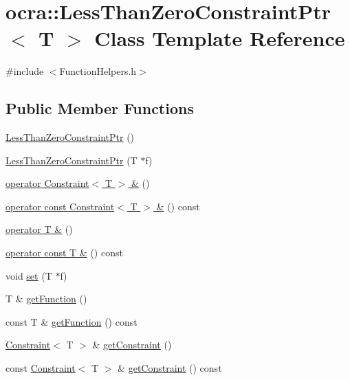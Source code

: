 \hypertarget{classocra_1_1LessThanZeroConstraintPtr}{}\section{ocra\+:\+:Less\+Than\+Zero\+Constraint\+Ptr$<$ T $>$ Class Template Reference}
\label{classocra_1_1LessThanZeroConstraintPtr}


{\ttfamily \#include $<$Function\+Helpers.\+h$>$}

\subsection*{Public Member Functions}
\begin{DoxyCompactItemize}
\item 
\hyperlink{classocra_1_1LessThanZeroConstraintPtr_af07ff846216e63b3fb91f91e46d429b8}{Less\+Than\+Zero\+Constraint\+Ptr} ()
\item 
\hyperlink{classocra_1_1LessThanZeroConstraintPtr_aa8e28fec379f5aa5ee146543fecc8e9a}{Less\+Than\+Zero\+Constraint\+Ptr} (T $\ast$f)
\item 
\hyperlink{classocra_1_1LessThanZeroConstraintPtr_a028c60ee38fce1047142de48acb1dae5}{operator Constraint$<$ T $>$ \&} ()
\item 
\hyperlink{classocra_1_1LessThanZeroConstraintPtr_a6714cc443513bdf5e8386ac7e1528d28}{operator const Constraint$<$ T $>$ \&} () const 
\item 
\hyperlink{classocra_1_1LessThanZeroConstraintPtr_ad2d278d71c55a299c7cef9180ff4132a}{operator T \&} ()
\item 
\hyperlink{classocra_1_1LessThanZeroConstraintPtr_ae3509621fd0f7d51c207a39188fb44e0}{operator const T \&} () const 
\item 
void \hyperlink{classocra_1_1LessThanZeroConstraintPtr_a7f0fc4747b1648423d3664b5def67589}{set} (T $\ast$f)
\item 
T \& \hyperlink{classocra_1_1LessThanZeroConstraintPtr_aa2b223f5891963f1b8be99e4408de9f2}{get\+Function} ()
\item 
const T \& \hyperlink{classocra_1_1LessThanZeroConstraintPtr_aa9d4f78c8caf3ada1ca714920f12a3ae}{get\+Function} () const 
\item 
\hyperlink{classocra_1_1Constraint}{Constraint}$<$ T $>$ \& \hyperlink{classocra_1_1LessThanZeroConstraintPtr_aa0d2d38bfa583d77e6b59c683978f3be}{get\+Constraint} ()
\item 
const \hyperlink{classocra_1_1Constraint}{Constraint}$<$ T $>$ \& \hyperlink{classocra_1_1LessThanZeroConstraintPtr_a575a402161bf7cf702353b23e74d610c}{get\+Constraint} () const 
\end{DoxyCompactItemize}


